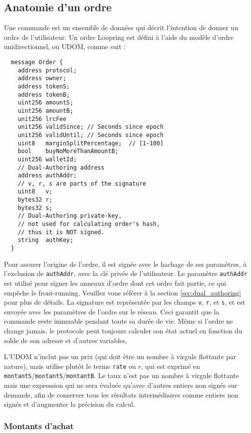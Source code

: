 \documentclass[UTF8,nofonts]{article}
\begin{document}
\begin{multicols}{2}
\subsection{Anatomie d'un ordre\label{anatomy}}
Une commande est un ensemble de données qui décrit l'intention de donner un ordre de l'utilisateur. Un ordre Loopring est défini à l'aide du modèle d'ordre unidirectionnel, ou UDOM, comme suit :

\begin{verbatim}
  message Order {
    address protocol;
    address owner;
    address tokenS;
    address tokenB;
    uint256 amountS;
    uint256 amountB;
    unit256 lrcFee
    unit256 validSince; // Seconds since epoch
    unit256 validUntil; // Seconds since epoch
    uint8   marginSplitPercentage;  // [1-100]
    bool    buyNoMoreThanAmountB;
    uint256 walletId;
    // Dual-Authoring address
    address authAddr;
   	// v, r, s are parts of the signature
    uint8   v;       
    bytes32 r;
    bytes32 s;
    // Dual-Authoring private-key,
    // not used for calculating order's hash,
    // thus it is NOT signed.
    string  authKey;          
  }
\end{verbatim}


Pour assurer l'origine de l’ordre, il est signée avec le hachage de ses paramètres, à l'exclusion de \verb|authAddr|, avec la clé privée de l'utilisateur. Le paramètre \verb|authAddr| est utilisé pour signer les anneaux d'ordre dont cet ordre fait partie, ce qui empêche le front-running. Veuillez vous référer à la section \ref{sec:dual_authoring} pour plus de détails. La signature est représentée par les champs \verb|v|, \verb|r|, et \verb|s|, et est envoyée avec les paramètres de l'ordre sur le réseau. Ceci garantit que la commande reste immuable pendant toute sa durée de vie. Même si l'ordre ne change jamais, le protocole peut toujours calculer son état actuel en fonction du solde de son adresse et d'autres variables.



L'UDOM n'inclut pas un prix (qui doit être un nombre à virgule flottante par nature), mais utilise plutôt le terme \verb|rate| ou $r$, qui est exprimé en \verb|montantS|/\verb|montantS|/\verb|montantB|. Le taux n'est pas un nombre à virgule flottante mais une expression qui ne sera évaluée qu'avec d'autres entiers non signés sur demande, afin de conserver tous les résultats intermédiaires comme entiers non signés et d'augmenter la précision du calcul.

\subsubsection{Montants d'achat}


\end{multicols}
\end{document}
